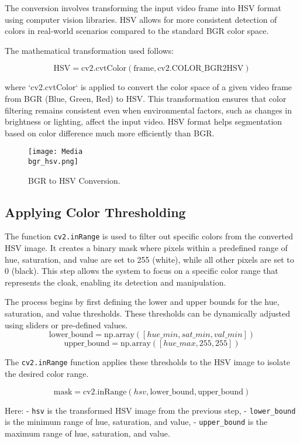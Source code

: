 \documentclass[onecolumn]{article} %
\begin{document}
The conversion involves transforming the input video frame into HSV format using computer vision libraries. HSV allows for more consistent detection of colors in real-world scenarios compared to the standard BGR color space.

The mathematical transformation used follows:

\[
\text{HSV} = \text{cv2.cvtColor}(\text{frame}, \text{cv2.COLOR_BGR2HSV})
\]

where `cv2.cvtColor` is applied to convert the color space of a given video frame from BGR (Blue, Green, Red) to HSV. This transformation ensures that color filtering remains consistent even when environmental factors, such as changes in brightness or lighting, affect the input video. HSV format helps segmentation based on color difference much more efficiently than BGR.

\begin{figure}[h!]
    \centering
    \texttt{[image: Media\\bgr\_hsv.png]}
    \caption{BGR to HSV Conversion.}
    \label{fig:BGR_HSV}
\end{figure}

\subsection{Applying Color Thresholding}

The function \texttt{cv2.inRange} is used to filter out specific colors from the converted HSV image. It creates a binary mask where pixels within a predefined range of hue, saturation, and value are set to 255 (white), while all other pixels are set to 0 (black). This step allows the system to focus on a specific color range that represents the cloak, enabling its detection and manipulation.

The process begins by first defining the lower and upper bounds for the hue, saturation, and value thresholds. These thresholds can be dynamically adjusted using sliders or pre-defined values. 
\[
\text{lower\_bound} = \text{np.array}([hue\_min, sat\_min, val\_min])
\]
\[
\text{upper\_bound} = \text{np.array}([hue\_max, 255, 255])
\]

The \texttt{cv2.inRange} function applies these thresholds to the HSV image to isolate the desired color range.

\[
\text{mask} = \text{cv2.inRange}(hsv, \text{lower\_bound}, \text{upper\_bound})
\]

Here:
- \texttt{hsv} is the transformed HSV image from the previous step,
- \texttt{lower\_bound} is the minimum range of hue, saturation, and value,
- \texttt{upper\_bound} is the maximum range of hue, saturation, and value.
\end{document}
